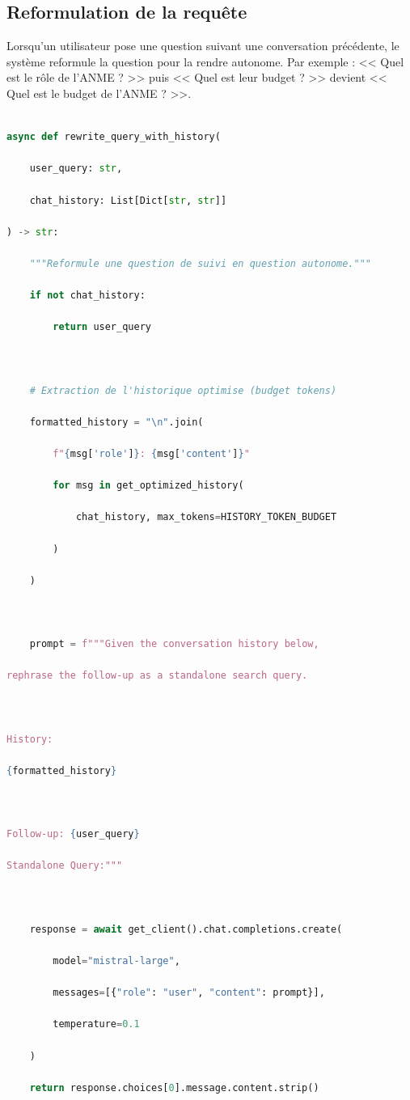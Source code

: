 \documentclass[12pt,a4paper,oneside]{report}
\begin{document}
\subsection{Reformulation de la requ\^{e}te}



Lorsqu'un utilisateur pose une question suivant une conversation pr\'{e}c\'{e}dente, le syst\`{e}me reformule la question pour la rendre autonome. Par exemple : << Quel est le r\^{o}le de l'ANME ? >> puis << Quel est leur budget ? >> devient << Quel est le budget de l'ANME ? >>.



\begin{lstlisting}[language=Python,caption={Fonction de reformulation de requ\^{e}te},label={lst:rewrite}]

async def rewrite_query_with_history(

    user_query: str,

    chat_history: List[Dict[str, str]]

) -> str:

    """Reformule une question de suivi en question autonome."""

    if not chat_history:

        return user_query



    # Extraction de l'historique optimise (budget tokens)

    formatted_history = "\n".join(

        f"{msg['role']}: {msg['content']}"

        for msg in get_optimized_history(

            chat_history, max_tokens=HISTORY_TOKEN_BUDGET

        )

    )



    prompt = f"""Given the conversation history below,

rephrase the follow-up as a standalone search query.



History:

{formatted_history}



Follow-up: {user_query}

Standalone Query:"""



    response = await get_client().chat.completions.create(

        model="mistral-large",

        messages=[{"role": "user", "content": prompt}],

        temperature=0.1

    )

    return response.choices[0].message.content.strip()

\end{lstlisting}
\end{document}
